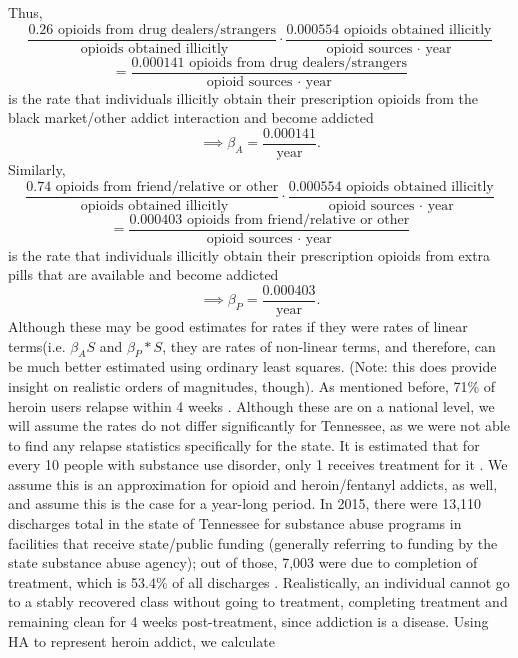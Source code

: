 \documentclass[12pt]{article}
\begin{document}
Thus, 
$$\frac{0.26 \text{ opioids from drug dealers/strangers}}{\text{ opioids obtained illicitly}}\cdot \frac{0.000554 \text{ opioids obtained illicitly}}{\text{opioid sources $\cdot$ year}}$$
$$ =\frac{0.000141 \text{ opioids from drug dealers/strangers}}{\text{opioid sources $\cdot$ year}}$$
is the rate that individuals illicitly obtain their prescription opioids from the black market/other addict interaction and become addicted
$$\implies \beta_A=\frac{0.000141}{\text{year}}.$$
Similarly,
$$\frac{0.74 \text{ opioids from friend/relative or other}}{\text{ opioids obtained illicitly}}\cdot \frac{0.000554 \text{ opioids obtained illicitly}}{\text{opioid sources $\cdot$ year}}$$
$$ =\frac{0.000403 \text{ opioids from friend/relative or other}}{\text{opioid sources $\cdot$ year}}$$
is the rate that individuals illicitly obtain their prescription opioids from extra pills that are available and become addicted
$$ \implies \beta_P=\frac{0.000403}{\text{year}}.$$ 
Although these may be good estimates for rates if they were rates of linear terms(i.e. $\beta_A S$ and $\beta_P *S$, they are rates of non-linear terms, and therefore, can be much better estimated using ordinary least squares. (Note: this does provide insight on realistic orders of magnitudes, though).  
As mentioned before, 71\% of heroin users relapse within 4 weeks \cite{Smyth}. Although these are on a national level, we will assume the rates do not differ significantly for Tennessee, as we were not able to find any relapse statistics specifically for the state. It is estimated that for every 10 people with substance use disorder, only 1 receives treatment for it \cite{SurgeonGeneral}. We assume this is an approximation for opioid and heroin/fentanyl addicts, as well, and assume this is the case for a year-long period. In 2015, there were 13,110 discharges total in the state of Tennessee for substance abuse programs in facilities that receive state/public funding (generally referring to funding by the state substance abuse agency); out of those, 7,003 were due to completion of treatment, which is 53.4\% of all discharges \cite{TEDS2015_SAMSHA_discharges}. Realistically, an individual cannot go to a stably recovered class without going to treatment, completing treatment and remaining clean for 4 weeks post-treatment, since addiction is a disease. Using HA to represent heroin addict, we calculate
\end{document}
